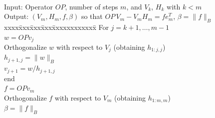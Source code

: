 \begin{algorithm}~\rm
\begin{tabbing}
Input: Operator $O\!P$, number of steps $m$, and $V_k$, $H_k$ with $k<m$  \\
Output: $(V_m,H_m,f,\beta)$ so that $O\!P\,V_m-V_mH_m=fe_m^T$, $\beta=\|f\|_B$ \\
xxxx\=xxx\=xxx\=xxx\=xxxxxxxxxxxx\=\kill
\> For $j=k+1,\ldots,m-1$\\
\> \> $w=O\!Pv_j$ \\
\> \> Orthogonalize $w$ with respect to $V_j$ (obtaining $h_{1:j,j}$) \\
\> \> $h_{j+1,j}=\|w\|_B$ \\
\> \> $v_{j+1}=w/h_{j+1,j}$ \\
\> end \\
\> $f=O\!Pv_m$ \\
\> Orthogonalize $f$ with respect to $V_m$ (obtaining $h_{1:m,m}$) \\
\> $\beta=\|f\|_B$ \\
\end{tabbing}
\end{algorithm}

%

